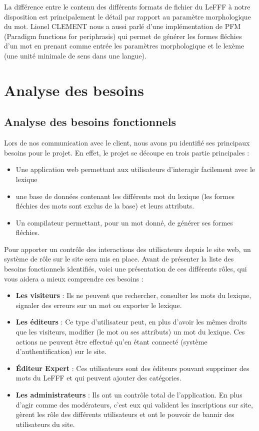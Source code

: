 \documentclass[12pt,a4paper]{article}
\begin{document}
La différence entre le contenu des différents formats de fichier du LeFFF à notre disposition est principalement le détail par rapport au paramètre morphologique du mot.
Lionel CLEMENT nous a aussi parlé d'une implémentation de PFM (Paradigm functions for periphrasis) qui permet de générer les formes fléchies d'un mot en prenant comme entrée les paramètres morphologique et le lexème (une unité minimale de sens dans une langue).
\section{Analyse des besoins}
\subsection{Analyse des besoins fonctionnels}
\smallbreak Lors de nos communication avec le client, nous avons pu identifié ses principaux besoins pour le projet. En effet, le projet se découpe en trois partie principales : 
\begin{itemize}  
  \item Une application web permettant aux utilisateurs d'interagir facilement avec le lexique
  \item une base de données contenant les différents mot du lexique (les formes fléchies des mots sont exclus de la base) et leurs attributs.
  \item Un compilateur permettant, pour un mot donné, de générer ses formes fléchies.
\end{itemize}

\smallbreak Pour apporter un contrôle des interactions des utilisateurs depuis le site web, un système de rôle sur le site sera mis en place. Avant de présenter la liste des besoins fonctionnels identifiés, voici une présentation de ces différents rôles, qui vous aidera a mieux comprendre ces besoins : 
\begin{itemize}  
  \item \textbf{Les visiteurs} : Ils ne peuvent que rechercher, consulter les mots du lexique, signaler des erreurs sur un mot ou exporter le lexique.
  \item \textbf{Les éditeurs} : Ce type d'utilisateur peut, en plus d'avoir les mêmes droits que les visiteurs, modifier (le mot ou ses attributs) un mot du lexique. Ces actions ne peuvent être effectué qu'en étant connecté (système d'authentification) sur le site.
  \item \textbf{Éditeur Expert} :  Ces utilisateurs sont des éditeurs pouvant supprimer des mots du LeFFF et qui peuvent ajouter des catégories.
  \item \textbf{Les administrateurs} : Ils ont un contrôle total de l'application. En plus d'agir comme des modérateurs, c'est eux qui valident les inscriptions sur site, gèrent les rôle des différents utilisateurs et ont le pouvoir de bannir des utilisateurs du site.
\end{itemize}
\end{document}
